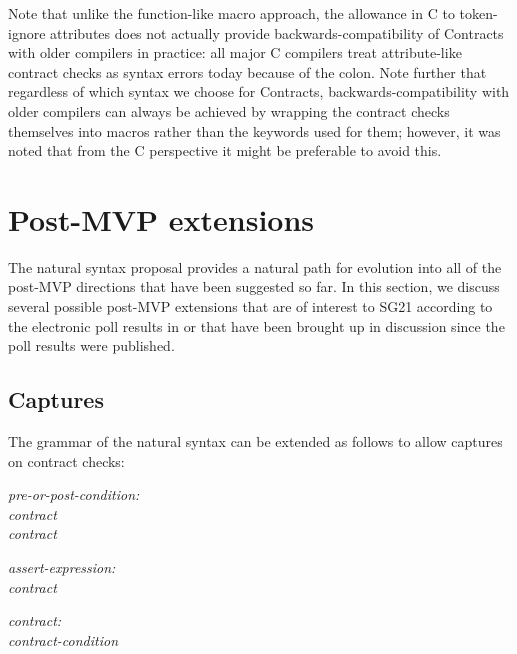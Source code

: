Note that unlike the function-like macro approach, the allowance in C to token-ignore attributes does not actually provide backwards-compatibility of Contracts with older compilers in practice: all major C compilers treat attribute-like contract checks as syntax errors today because of the colon. Note further that regardless of which syntax we choose for Contracts, backwards-compatibility with older compilers can always be achieved by wrapping the contract checks themselves into macros rather than the keywords used for them; however, it was noted that from the C perspective it might be preferable to avoid this.



\section{Post-MVP extensions}

The natural syntax proposal provides a natural path for evolution into all of the post-MVP directions that have been suggested so far. In this section, we discuss several possible post-MVP extensions that are of interest to SG21 according to the electronic poll results in \cite{P2885R3} or that have been brought up in discussion since the poll results were published.

\subsection{Captures}
\label{subsec:captures}

The grammar of the natural syntax can be extended as follows to allow captures on contract checks:

\begin{adjustwidth}{0.5cm}{0.5cm}

\emph{pre-or-post-condition:} \\
\phantom{~~~} \emph{contract} \\
\phantom{~~~} \emph{contract}

\emph{assert-expression:} \\
\phantom{~~~} \emph{contract}

\emph{contract:} \\
\phantom{~~~} \emph{contract-condition}

 \\
\phantom{~~~}

\end{adjustwidth}

